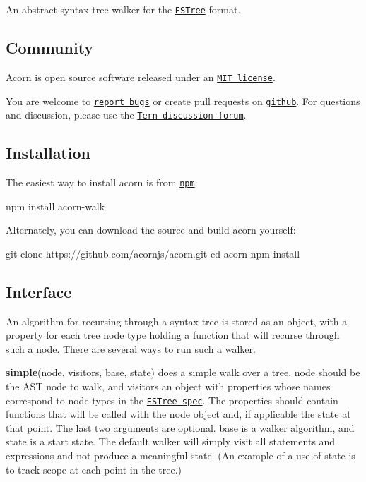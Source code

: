 An abstract syntax tree walker for the \href{https://github.com/estree/estree}{\tt E\+S\+Tree} format.

\subsection*{Community}

Acorn is open source software released under an \href{https://github.com/acornjs/acorn/blob/master/acorn-walk/LICENSE}{\tt M\+IT license}.

You are welcome to \href{https://github.com/acornjs/acorn/issues}{\tt report bugs} or create pull requests on \href{https://github.com/acornjs/acorn}{\tt github}. For questions and discussion, please use the \href{https://discuss.ternjs.net}{\tt Tern discussion forum}.

\subsection*{Installation}

The easiest way to install acorn is from \href{https://www.npmjs.com/}{\tt {\ttfamily npm}}\+:


\begin{DoxyCode}
npm install acorn-walk
\end{DoxyCode}


Alternately, you can download the source and build acorn yourself\+:


\begin{DoxyCode}
git clone https://github.com/acornjs/acorn.git
cd acorn
npm install
\end{DoxyCode}


\subsection*{Interface}

An algorithm for recursing through a syntax tree is stored as an object, with a property for each tree node type holding a function that will recurse through such a node. There are several ways to run such a walker.

{\bfseries simple}{\ttfamily (node, visitors, base, state)} does a \textquotesingle{}simple\textquotesingle{} walk over a tree. {\ttfamily node} should be the A\+ST node to walk, and {\ttfamily visitors} an object with properties whose names correspond to node types in the \href{https://github.com/estree/estree}{\tt E\+S\+Tree spec}. The properties should contain functions that will be called with the node object and, if applicable the state at that point. The last two arguments are optional. {\ttfamily base} is a walker algorithm, and {\ttfamily state} is a start state. The default walker will simply visit all statements and expressions and not produce a meaningful state. (An example of a use of state is to track scope at each point in the tree.)


